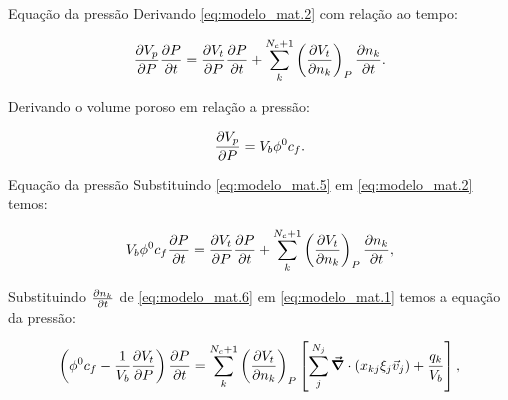 \documentclass[professionalfont]{beamer}
\begin{document}
\begin{frame}{Equação da pressão}
    Derivando \eqref{eq:modelo_mat.2} com relação ao tempo:

    \begin{equation}
        \label{eq:modelo_mat.2.1}
        \frac{\partial V_{p}}{\partial P} \frac{\partial P}{\partial t} = \frac{\partial V_{t}}{\partial P} \frac{\partial P}{\partial t} + \sum_{k}^{N_{c} + 1} \left( \frac{\partial V_{t}}{\partial n_{k}}  \right)_{P} \frac{\partial n_{k}}{\partial t}.
    \end{equation}

    Derivando o volume poroso em relação a pressão:

    \begin{equation}
        \label{eq:modelo_mat.5}
        \frac{\partial V_{p}}{\partial P} = V_{b} \phi^{0} c_{f} .
    \end{equation}
    
\end{frame}

\begin{frame}{Equação da pressão}
    Substituindo \eqref{eq:modelo_mat.5} em \eqref{eq:modelo_mat.2} temos:

    \begin{equation}
        \label{eq:modelo_mat.6}
        V_{b} \phi^{0} c_{f} \frac{\partial P}{\partial t} = \frac{\partial V_{t}}{\partial P} \frac{\partial P}{\partial t} + \sum_{k}^{N_{c} + 1} \left( \frac{\partial V_{t}}{\partial n_{k}}  \right)_{P} \frac{\partial n_{k}}{\partial t},
    \end{equation}

    Substituindo $\frac{\partial n_{k}}{\partial t}$ de \eqref{eq:modelo_mat.6} em  \eqref{eq:modelo_mat.1} temos a equação da pressão:

    \begin{equation}
        \label{eq:modelo_mat.7}
        \left( \phi^{0} c_{f} - \dfrac{1}{V_{b}} \frac{\partial V_{t}}{\partial P} \right) \frac{\partial P}{\partial t} = \sum_{k}^{N_{c} + 1} \left( \frac{\partial V_{t}}{\partial n_{k}}  \right)_{P} \left[ \sum_{j}^{N_{j}} \mbox{\boldmath$ \vec{\nabla} $} \cdot \left(x_{k j} \xi_{j} \vec{v}_{j} \right) + \dfrac{q_{k}}{V_{b}}\right], 
    \end{equation}
    
\end{frame}
\end{document}
